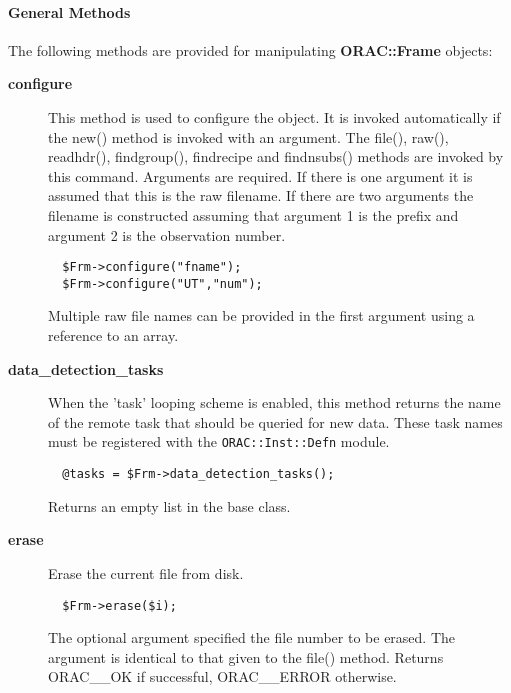 \paragraph*{General Methods\label{ORAC::Frame_General_Methods}}


The following methods are provided for manipulating
\textbf{ORAC::Frame} objects:

\begin{description}

\item[{\textbf{configure}}] \mbox{}

This method is used to configure the object. It is invoked
automatically if the new() method is invoked with an argument. The
file(), raw(), readhdr(), findgroup(), findrecipe and findnsubs()
methods are invoked by this command. Arguments are required.  If there
is one argument it is assumed that this is the raw filename. If there
are two arguments the filename is constructed assuming that argument 1
is the prefix and argument 2 is the observation number.

\begin{verbatim}
  $Frm->configure("fname");
  $Frm->configure("UT","num");
\end{verbatim}


Multiple raw file names can be provided in the first argument using
a reference to an array.


\item[{\textbf{data\_detection\_tasks}}] \mbox{}

When the 'task' looping scheme is enabled, this method returns the name
of the remote task that should be queried for new data. These task names
must be registered with the \texttt{ORAC::Inst::Defn} module.

\begin{verbatim}
  @tasks = $Frm->data_detection_tasks();
\end{verbatim}


Returns an empty list in the base class.


\item[{\textbf{erase}}] \mbox{}

Erase the current file from disk.

\begin{verbatim}
  $Frm->erase($i);
\end{verbatim}


The optional argument specified the file number to be erased.
The argument is identical to that given to the file() method.
Returns ORAC\_\_OK if successful, ORAC\_\_ERROR otherwise.




\end{description}
